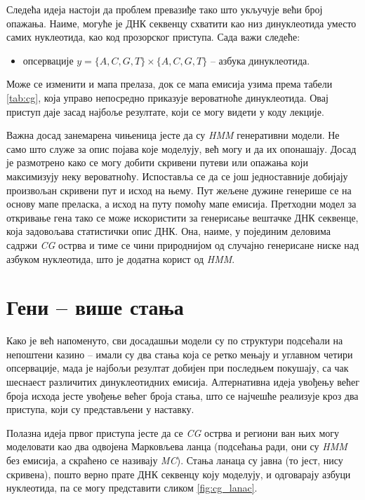 \documentclass[12pt,oneside]{memoir}
\begin{document}
\begin{CJK}{UTF8}{ipxm}
Следећа идеја настоји да проблем превазиђе тако што укључује већи број опажања. Наиме, могуће је ДНК секвенцу схватити као низ динуклеотида уместо самих нуклеотида, као код прозорског приступа. Сада важи следеће:
\begin{itemize}
  \item опсервације $y = \{A, C, G, T\} \times \{A, C, G, T\}$ -- азбука динуклеотида.
\end{itemize}
Може се изменити и мапа прелаза, док се мапа емисија узима према табели \ref{tab:cg}, која управо непосредно приказује вероватноће динуклеотида. Овај приступ даје засад најбоље резултате, који се могу видети у коду лекције.

Важна досад занемарена чињеница јесте да су \textit{HMM} генеративни модели. Не само што служе за опис појава које моделују, већ могу и да их опонашају. Досад је размотрено како се могу добити скривени путеви или опажања који максимизују неку вероватноћу. Испоставља се да се још једноставније добијају произвољан скривени пут и исход на њему. Пут жељене дужине генерише се на основу мапе преласка, а исход на путу помоћу мапе емисија. Претходни модел за откривање гена тако се може искористити за генерисање вештачке ДНК секвенце, која задовољава статистички опис ДНК. Она, наиме, у појединим деловима садржи \textit{CG} острва и тиме се чини природнијом од случајно генерисане ниске над азбуком нуклеотида, што је додатна корист од \textit{HMM}.

\section{Гени -- више стања}
Како је већ напоменуто, сви досадашњи модели су по структури подсећали на непоштени казино -- имали су два стања која се ретко мењају и углавном четири опсервације, мада је најбољи резултат добијен при последњем покушају, са чак шеснаест различитих динуклеотидних емисија. Алтернативна идеја увођењу већег броја исхода јесте увођење већег броја стања, што се најчешће реализује кроз два приступа, који су представљени у наставку.

Полазна идеја првог приступа \cite{durbin1998} јесте да се \textit{CG} острва и региони ван њих могу моделовати као два одвојена Марковљева ланца (подсећања ради, они су \textit{HMM} без емисија, а скраћено се називају \textit{MC}). Стања ланаца су јавна (то јест, нису скривена), пошто верно прате ДНК секвенцу коју моделују, и одговарају азбуци нуклеотида, па се могу представити сликом \ref{fig:cg_lanac}.


\end{CJK}
\end{document}
